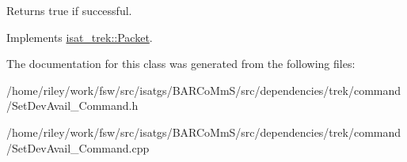\begin{DoxyReturn}{Returns}
true if successful. 
\end{DoxyReturn}


Implements \hyperlink{classisat__trek_1_1_packet}{isat\+\_\+trek\+::\+Packet}.



The documentation for this class was generated from the following files\+:\begin{DoxyCompactItemize}
\item 
/home/riley/work/fsw/src/isatgs/\+B\+A\+R\+Co\+Mm\+S/src/dependencies/trek/command/Set\+Dev\+Avail\+\_\+\+Command.\+h\item 
/home/riley/work/fsw/src/isatgs/\+B\+A\+R\+Co\+Mm\+S/src/dependencies/trek/command/Set\+Dev\+Avail\+\_\+\+Command.\+cpp\end{DoxyCompactItemize}
